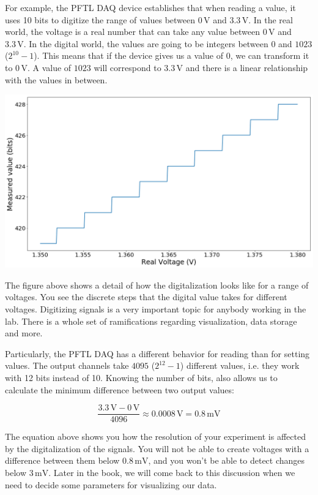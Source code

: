 For example, the {PFTL DAQ} device establishes that when reading a value, it uses 10 bits to digitize the range of values between $0\,\textrm{V}$ and $3.3\,\textrm{V}$. In the real world, the voltage is a real number that can take any value between $0\,\textrm{V}$ and $3.3\,\textrm{V}$. In the digital world, the values are going to be integers between $0$ and $1023$ ($2^{10}-1$). This means that if the device gives us a value of $0$, we can transform it to $0\,\textrm{V}$. A value of $1023$ will correspond to $3.3\,\textrm{V}$ and there is a linear relationship with the values in between.

\begin{center}
\includegraphics[width=.6\textwidth]{images/Chapter_03/digitalization.png}
\end{center}

The figure above shows a detail of how the digitalization looks like for a range of voltages. You see the discrete steps that the digital value takes for different voltages. Digitizing signals is a very important topic for anybody working in the lab. There is a whole set of ramifications regarding visualization, data storage and more.

Particularly, the {PFTL DAQ} has a different behavior for reading than for setting values. The output channels take $4095$ ($2^{12}-1$) different values, i.e. they work with 12 bits instead of 10. Knowing the number of bits, also allows us to calculate the minimum difference between two output values:

\begin{equation}
 \frac{3.3\,\textrm{V} - 0\,\textrm{V}}{4096} \approx 0.0008\,\textrm{V} = 0.8\,\textrm{mV}
\end{equation}

The equation above shows you how the resolution of your experiment is affected by the digitalization of the signals. You will not be able to create voltages with a difference between them below $0.8\,\textrm{mV}$, and you won't be able to detect changes below $3\,\textrm{mV}$. Later in the book, we will come back to this discussion when we need to decide some parameters for visualizing our data.

